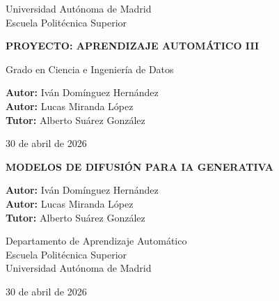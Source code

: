 \documentclass[11pt, a4paper, twoside, openright]{book}
\begin{document}
\frontmatter
\begin{titlepage}
  \centering
  {\large Universidad Autónoma de Madrid \\ Escuela Politécnica Superior \par}
  \vspace{2cm}
  \vspace{2cm}
  {\Huge\bfseries PROYECTO: APRENDIZAJE AUTOMÁTICO III\par}
  \vspace{1cm}
  {\large Grado en Ciencia e Ingeniería de Datos\par}
  \vfill
  {\large
   \textbf{Autor:} Iván Domínguez Hernández\\
   \textbf{Autor:} Lucas Miranda López\\
   \textbf{Tutor:} Alberto Suárez González\par}
  \vspace{1cm}
  {\large 30 de abril de 2026\par}
\end{titlepage}

\begin{titlepage}
  \centering
  \vspace*{2cm}
  {\Huge\bfseries MODELOS DE DIFUSIÓN PARA IA GENERATIVA\par}
  \vspace{1.5cm}
  {\large
   \textbf{Autor:} Iván Domínguez Hernández\\
   \textbf{Autor:} Lucas Miranda López\\
   \textbf{Tutor:} Alberto Suárez González\par}
  \vfill
  {\large
   Departamento de Aprendizaje Automático\\
   Escuela Politécnica Superior\\
   Universidad Autónoma de Madrid\par}
  \vspace{1cm}
  {\large 30 de abril de 2026\par}
\end{titlepage}



\tableofcontents

\mainmatter








\appendix

\end{document}
